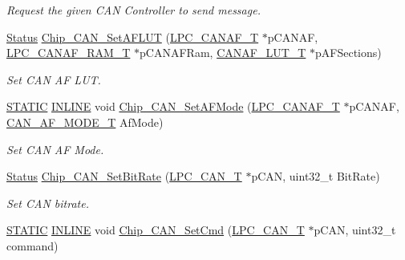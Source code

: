 \begin{DoxyCompactItemize}
\begin{DoxyCompactList}\small\item\em Request the given C\+AN Controller to send message. \end{DoxyCompactList}\item 
\hyperlink{group__LPC__Types__Public__Types_ga67a0db04d321a74b7e7fcfd3f1a3f70b}{Status} \hyperlink{group__CAN__17XX__40XX_gaa58803ce4de8c8520925ebd1cbfd2019}{Chip\+\_\+\+C\+A\+N\+\_\+\+Set\+A\+F\+L\+UT} (\hyperlink{structLPC__CANAF__T}{L\+P\+C\+\_\+\+C\+A\+N\+A\+F\+\_\+T} $\ast$p\+C\+A\+N\+AF, \hyperlink{structLPC__CANAF__RAM__T}{L\+P\+C\+\_\+\+C\+A\+N\+A\+F\+\_\+\+R\+A\+M\+\_\+T} $\ast$p\+C\+A\+N\+A\+F\+Ram, \hyperlink{structCANAF__LUT__T}{C\+A\+N\+A\+F\+\_\+\+L\+U\+T\+\_\+T} $\ast$p\+A\+F\+Sections)
\begin{DoxyCompactList}\small\item\em Set C\+AN AF L\+UT. \end{DoxyCompactList}\item 
\hyperlink{group__LPC__Types__Public__Macros_ga10b2d890d871e1489bb02b7e70d9bdfb}{S\+T\+A\+T\+IC} \hyperlink{group__LPC__Types__Public__Types_ga2eb6f9e0395b47b8d5e3eeae4fe0c116}{I\+N\+L\+I\+NE} void \hyperlink{group__CAN__17XX__40XX_gaea7126f0eb3c4195137d5158415410a2}{Chip\+\_\+\+C\+A\+N\+\_\+\+Set\+A\+F\+Mode} (\hyperlink{structLPC__CANAF__T}{L\+P\+C\+\_\+\+C\+A\+N\+A\+F\+\_\+T} $\ast$p\+C\+A\+N\+AF, \hyperlink{group__CAN__17XX__40XX_gaf9abd01ef9ba38a2113a240871e9b48a}{C\+A\+N\+\_\+\+A\+F\+\_\+\+M\+O\+D\+E\+\_\+T} Af\+Mode)
\begin{DoxyCompactList}\small\item\em Set C\+AN AF Mode. \end{DoxyCompactList}\item 
\hyperlink{group__LPC__Types__Public__Types_ga67a0db04d321a74b7e7fcfd3f1a3f70b}{Status} \hyperlink{group__CAN__17XX__40XX_ga269c61b9e26af6f207632993274b04e5}{Chip\+\_\+\+C\+A\+N\+\_\+\+Set\+Bit\+Rate} (\hyperlink{structLPC__CAN__T}{L\+P\+C\+\_\+\+C\+A\+N\+\_\+T} $\ast$p\+C\+AN, uint32\+\_\+t Bit\+Rate)
\begin{DoxyCompactList}\small\item\em Set C\+AN bitrate. \end{DoxyCompactList}\item 
\hyperlink{group__LPC__Types__Public__Macros_ga10b2d890d871e1489bb02b7e70d9bdfb}{S\+T\+A\+T\+IC} \hyperlink{group__LPC__Types__Public__Types_ga2eb6f9e0395b47b8d5e3eeae4fe0c116}{I\+N\+L\+I\+NE} void \hyperlink{group__CAN__17XX__40XX_ga204f7aa9af769ea809d9dc54ef4408a9}{Chip\+\_\+\+C\+A\+N\+\_\+\+Set\+Cmd} (\hyperlink{structLPC__CAN__T}{L\+P\+C\+\_\+\+C\+A\+N\+\_\+T} $\ast$p\+C\+AN, uint32\+\_\+t command)

\end{DoxyCompactItemize}
